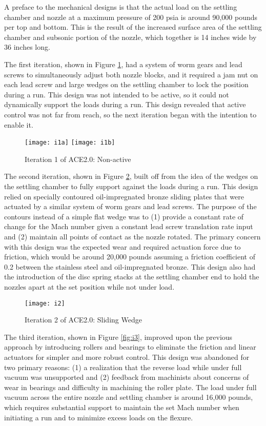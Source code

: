 A preface to the mechanical designs is that the actual load on the settling chamber and nozzle at a maximum pressure of 200 psia is around 90,000 pounds per top and bottom. This is the result of the increased surface area of the settling chamber and subsonic portion of the nozzle, which together is 14 inches wide by 36 inches long.

The first iteration, shown in Figure \ref{fig:i1}, had a system of worm gears and lead screws to simultaneously adjust both nozzle blocks, and it required a jam nut on each lead screw and large wedges on the settling chamber to lock the position during a run. This design was not intended to be active, so it could not dynamically support the loads during a run. This design revealed that active control was not far from reach, so the next iteration began with the intention to enable it.

\begin{figure}[ht!]
    \centering
    \texttt{[image: i1a]}
    \texttt{[image: i1b]}
    \caption{Iteration 1 of ACE2.0: Non-active}
    \label{fig:i1}
\end{figure}

The second iteration, shown in Figure \ref{fig:i2}, built off from the idea of the wedges on the settling chamber to fully support against the loads during a run. This design relied on specially contoured oil-impregnated bronze sliding plates that were actuated by a similar system of worm gears and lead screws. The purpose of the contours instead of a simple flat wedge was to (1) provide a constant rate of change for the Mach number given a constant lead screw translation rate input and (2) maintain all points of contact as the nozzle rotated. The primary concern with this design was the expected wear and required actuation force due to friction, which would be around 20,000 pounds assuming a friction coefficient of 0.2 between the stainless steel and oil-impregnated bronze. This design also had the introduction of the disc spring stacks at the settling chamber end to hold the nozzles apart at the set position while not under load. 

\begin{figure}[ht!]
    \centering
    \texttt{[image: i2]}
    \caption{Iteration 2 of ACE2.0: Sliding Wedge}
    \label{fig:i2}
\end{figure}

The third iteration, shown in Figure \ref{fig:i3}, improved upon the previous approach by introducing rollers and bearings to eliminate the friction and linear actuators for simpler and more robust control. This design was abandoned for two primary reasons: (1) a realization that the reverse load while under full vacuum was unsupported and (2) feedback from machinists about concerns of wear in bearings and difficulty in machining the roller plate. The load under full vacuum across the entire nozzle and settling chamber is around 16,000 pounds, which requires substantial support to maintain the set Mach number when initiating a run and to minimize excess loads on the flexure.

